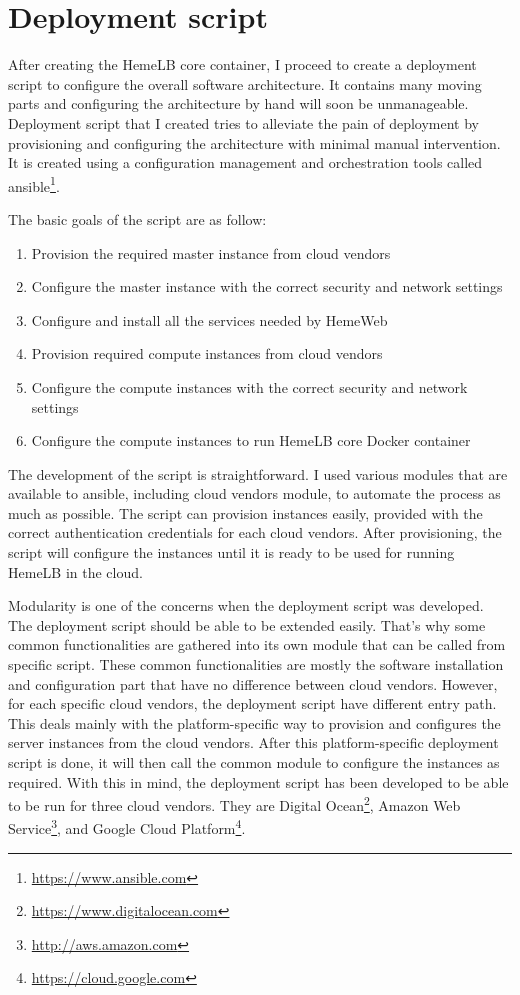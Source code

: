 \section{Deployment script}

After creating the HemeLB core container, I proceed to create a deployment script to configure the overall software architecture. It contains many moving parts and configuring the architecture by hand will soon be unmanageable. Deployment script that I created tries to alleviate the pain of deployment by provisioning and configuring the architecture with minimal manual intervention. It is created using a configuration management and orchestration tools called ansible\footnote{\url{https://www.ansible.com}}.

The basic goals of the script are as follow:
\begin{enumerate}
\item Provision the required master instance from cloud vendors
\item Configure the master instance with the correct security and network settings
\item Configure and install all the services needed by HemeWeb
\item Provision required compute instances from cloud vendors
\item Configure the compute instances with the correct security and network settings
\item Configure the compute instances to run HemeLB core Docker container
\end{enumerate}

The development of the script is straightforward. I used various modules that are available to ansible, including cloud vendors module, to automate the process as much as possible. The script can provision instances easily, provided with the correct authentication credentials for each cloud vendors. After provisioning, the script will configure the instances until it is ready to be used for running HemeLB in the cloud.

Modularity is one of the concerns when the deployment script was developed. The deployment script should be able to be extended easily. That's why some common functionalities are gathered into its own module that can be called from specific script. These common functionalities are mostly the software installation and configuration part that have no difference between cloud vendors. However, for each specific cloud vendors, the deployment script have different entry path. This deals mainly with the platform-specific way to provision and configures the server instances from the cloud vendors. After this platform-specific deployment script is done, it will then call the common module to configure the instances as required. With this in mind, the deployment script has been developed to be able to be run for three cloud vendors. They are Digital Ocean\footnote{\url{https://www.digitalocean.com}}, Amazon Web Service\footnote{\url{http://aws.amazon.com}}, and Google Cloud Platform\footnote{\url{https://cloud.google.com}}.

